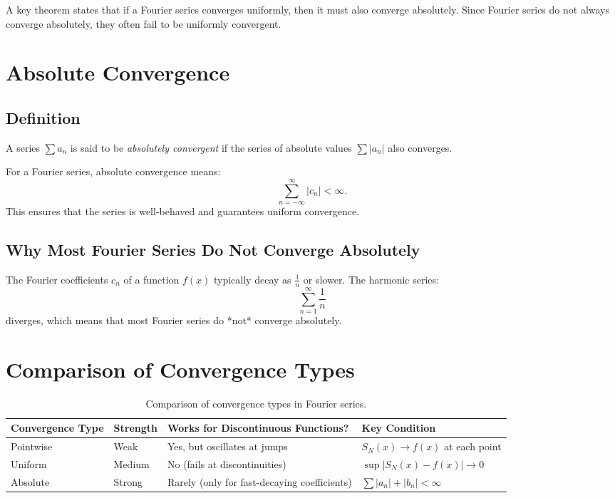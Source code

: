 A key theorem states that if a Fourier series converges uniformly, then it must also converge absolutely. Since Fourier series do not always converge absolutely, they often fail to be uniformly convergent.

\section{Absolute Convergence}
\subsection{Definition}
A series $\sum a_n$ is said to be \textit{absolutely convergent} if the series of absolute values $\sum |a_n|$ also converges.

For a Fourier series, absolute convergence means:
\[
\sum_{n=-\infty}^{\infty} |c_n| < \infty.
\]
This ensures that the series is well-behaved and guarantees uniform convergence.

\subsection{Why Most Fourier Series Do Not Converge Absolutely}
The Fourier coefficients $c_n$ of a function $f(x)$ typically decay as $\frac{1}{n}$ or slower. The harmonic series:
\[
\sum_{n=1}^{\infty} \frac{1}{n}
\]
diverges, which means that most Fourier series do *not* converge absolutely.



\section{Comparison of Convergence Types}
\begin{table}[h]
    \centering
    \renewcommand{\arraystretch}{1.3}
    \begin{tabular}{p{4cm} p{3cm} p{5cm} p{4cm}}
        \toprule
        \textbf{Convergence Type} & \textbf{Strength} & \textbf{Works for Discontinuous Functions?} & \textbf{Key Condition} \\
        \midrule
        Pointwise   & Weak  & Yes, but oscillates at jumps  & $S_N(x) \to f(x)$ at each point \\
        \midrule
        Uniform    & Medium  & No (fails at discontinuities) & $\sup |S_N(x) - f(x)| \to 0$ \\
        \midrule
        Absolute   & Strong  & Rarely (only for fast-decaying coefficients) & $\sum |a_n| + |b_n| < \infty$ \\
        \bottomrule
    \end{tabular}
    \caption{Comparison of convergence types in Fourier series.}
\end{table}

